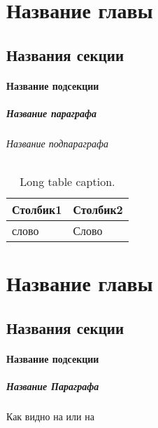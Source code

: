 \chapter{Название главы}
  \section{Названия секции}
    \subsubsection{Название подсекции}
      \paragraph{Название параграфа}
        \subparagraph{Название подпараграфа}
          \lipsum[2]\cite{BibExampleRU}
          \begin{center}
            \begin{xltabular}{\linewidth}{|l|X|}
              \caption{Long table caption.\label{long}}                                                                                                    \\
              \hline
              Столбик1  & Столбик2    \\
              \hline
              слово     & Слово       \\
              \hline
            \end{xltabular}
          \end{center}


\chapter{Название главы}
  \section{Названия секции}
    \subsubsection{Название подсекции}
      \paragraph{Название Параграфа}
        \lipsum[2]\cite{BibExampleRU}
        Как видно на  или на 

